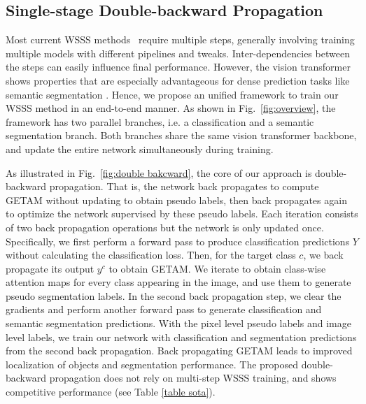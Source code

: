 \documentclass[10pt,twocolumn,letterpaper]{article}
\begin{document}
\subsection{Single-stage Double-backward Propagation}

Most current WSSS methods~\cite{wang2020self,chang2020weakly,zhang2020splitting,zhang2020reliability,guo2019mixup,yun2019cutmix,kim2021discriminative} require multiple steps, generally involving
training 
multiple models with
different pipelines and tweaks.
Inter-dependencies between the steps can easily influence final performance.
However,
the vision transformer shows properties that are especially advantageous for dense prediction tasks like semantic segmentation \cite{ranftl2021vision,liu2021swin,bao2021beit,wang2021pvtv2}. 
Hence, 
we propose an unified framework to train our WSSS method in an end-to-end manner.
As shown in Fig.~\ref{fig:overview},
the framework has two parallel branches, i.e. a classification and a semantic segmentation branch. 
Both branches share the same vision transformer backbone, and update the entire network simultaneously during training.










As illustrated in Fig.~\ref{fig:double bakcward}, 
the core of our approach is double-backward propagation. 
That is, the network back propagates to compute GETAM without updating to obtain pseudo labels, then back propagates again to optimize the network supervised by these pseudo labels. 
Each iteration consists of two back propagation operations but the network is only updated once.
Specifically, we first perform a forward pass to produce classification predictions $Y$ without calculating the classification loss.
Then, for the target class $c$, we back propagate its output $y^c$ to obtain GETAM.
We iterate to obtain class-wise attention maps for every class appearing in the image, and use them
to generate pseudo segmentation labels.
In the second back propagation step, we clear the gradients and perform another forward pass to generate classification and semantic segmentation predictions. With the pixel level pseudo labels and image level labels, we train our network with classification and segmentation predictions from the second back propagation.
Back propagating GETAM
leads to improved localization of objects and segmentation performance. 
The proposed double-backward propagation does not rely on
multi-step WSSS training, and shows competitive performance (see Table \ref{table sota}).
\end{document}
